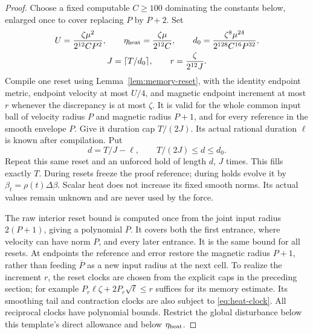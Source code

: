 \documentclass[11pt,a4paper]{amsart}
\theoremstyle{definition}
\theoremstyle{remark}
\numberwithin{equation}{section}
\begin{document}
\begin{proof}
Choose a fixed computable $C\ge100$ dominating the constants below,
enlarged once to cover replacing $P$ by $P+2$.  Set
\begin{equation}\label{eq:heat-choices}
 \begin{gathered}
 U=\frac{\zeta\mu^2}{2^{12}CP^2},\qquad
 \eta_{\rm heat}=\frac{\zeta\mu}{2^{12}C},\qquad
 d_0=\frac{\zeta^8\mu^{24}}{2^{128}C^{16}P^{32}},\\
 J=\lceil T/d_0\rceil,\qquad r=\frac\zeta{2^{12}J}.
 \end{gathered}
\end{equation}
Compile one reset using Lemma~\ref{lem:memory-reset}, with the identity
endpoint metric, endpoint velocity at most $U/4$, and magnetic endpoint
increment at most $r$ whenever the discrepancy is at most $\zeta$.
It is valid for the whole common input ball of velocity radius $P$ and
magnetic radius $P+1$, and for every reference in the smooth envelope
$P$.  Give it duration cap $T/(2J)$.  Its actual rational duration
$\ell$ is known after compilation.  Put
\begin{equation}\label{eq:heat-clock}
 d=T/J-\ell,
 \qquad T/(2J)\le d\le d_0.
\end{equation}
Repeat this same reset and an unforced hold of length $d$, $J$ times.
This fills exactly $T$.  During resets freeze the proof reference;
during holds evolve it by $\beta_t=\rho(t)\Delta\beta$.  Scalar heat
does not increase its fixed smooth norms.  Its actual values remain
unknown and are never used by the force.

The raw interior reset bound is computed once from the joint input radius
$2(P+1)$, giving a polynomial $\overline P$. It covers both the first
entrance, where velocity can have norm $P$, and every later entrance.
It is the same bound for
all resets.  At endpoints the reference and error restore the magnetic
radius $P+1$, rather than feeding $\overline P$ as a new input radius
at the next cell.  To realize the increment $r$, the reset clocks are
chosen from the explicit caps in the preceding section; for example
$P_r\ell\zeta+2P_r\sqrt\ell\le r$ suffices for its memory estimate.
Its smoothing tail and contraction clocks are also subject to
\eqref{eq:heat-clock}.  All reciprocal clocks have polynomial bounds.
Restrict the global disturbance below this template's direct allowance
and below $\eta_{\rm heat}$.


\end{proof}
\end{document}
